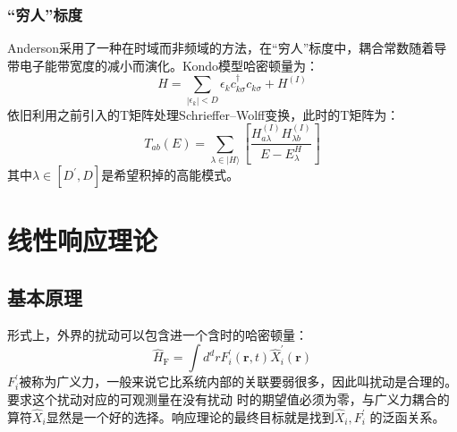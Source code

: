 \documentclass[10pt,openany]{book}
\theoremstyle{thmstyle} %
\theoremstyle{defstyle} %
\theoremstyle{prostyle} %
\begin{document}
	\subsubsection*{“穷人”标度}
	Anderson采用了一种在时域而非频域的方法，在“穷人”标度中，耦合常数随着导带电子能带宽度的减小而演化。Kondo模型哈密顿量为：
	\begin{equation}
		H=\sum_{\left|\epsilon_k\right|<D} \epsilon_k c_{k \sigma}^{\dagger} c_{k \sigma}+H^{(I)}
	\end{equation}
	依旧利用之前引入的T矩阵处理Schrieffer–Wolff变换，此时的T矩阵为：
	\begin{equation}
		T_{a b}(E)=\sum_{\lambda \in|H\rangle}\left[\frac{H_{a \lambda}^{(I)} H_{\lambda b}^{(I)}}{E-E_\lambda^H}\right]
	\end{equation}
	其中$ \lambda\in \left[D^{\prime}, D\right] $是希望积掉的高能模式。
	\section{线性响应理论}
	\subsection{基本原理}
	形式上，外界的扰动可以包含进一个含时的哈密顿量：
	\begin{equation}
		\hat{H}_{\mathrm{F}}=\int d^d r F_i^{\prime}(\mathbf{r}, t) \hat{X}_i^{\prime}(\mathbf{r})
	\end{equation}
	$ F_i^{\prime} $被称为广义力，一般来说它比系统内部的关联要弱很多，因此叫扰动是合理的。要求这个扰动对应的可观测量在没有扰动
	时的期望值必须为零，与广义力耦合的算符$ \hat{X}_i $显然是一个好的选择。响应理论的最终目标就是找到$ \hat{X}_i,F_i^{\prime} $
	的泛函关系。\\
\end{document}
